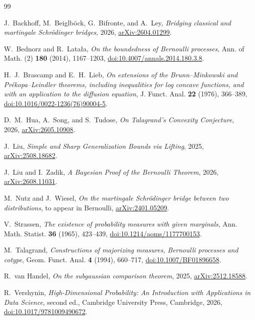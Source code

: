 \documentclass[11pt,reqno]{amsart}
\begin{document}
\begin{thebibliography}{99}

J.~Backhoff, M.~Beiglb\"ock, G.~Bifronte, and A.~Ley,
\emph{Bridging classical and martingale Schr\"odinger bridges},
2026, \href{https://arxiv.org/abs/2604.01299}{arXiv:2604.01299}.

W.~Bednorz and R.~Lata\l a,
\emph{On the boundedness of Bernoulli processes},
Ann. of Math. (2) \textbf{180} (2014), 1167--1203,
\href{https://doi.org/10.4007/annals.2014.180.3.8}
{doi:10.4007/annals.2014.180.3.8}.

H.~J.~Brascamp and E.~H.~Lieb,
\emph{On extensions of the Brunn--Minkowski and
Pr\'ekopa--Leindler theorems, including inequalities for log concave
functions, and with an application to the diffusion equation},
J. Funct. Anal. \textbf{22} (1976), 366--389,
\href{https://doi.org/10.1016/0022-1236(76)90004-5}
{doi:10.1016/0022-1236(76)90004-5}.

D.~M.~Hua, A.~Song, and S.~Tudose,
\emph{On Talagrand's Convexity Conjecture},
2026, \href{https://arxiv.org/abs/2605.10908}{arXiv:2605.10908}.

J.~Liu,
\emph{Simple and Sharp Generalization Bounds via Lifting},
2025, \href{https://arxiv.org/abs/2508.18682}{arXiv:2508.18682}.

J.~Liu and I.~Zadik,
\emph{A Bayesian Proof of the Bernoulli Theorem},
2026, \href{https://arxiv.org/abs/2608.11031}{arXiv:2608.11031}.

M.~Nutz and J.~Wiesel,
\emph{On the martingale Schr\"odinger bridge between two distributions},
to appear in Bernoulli,
\href{https://arxiv.org/abs/2401.05209}{arXiv:2401.05209}.

V.~Strassen,
\emph{The existence of probability measures with given marginals},
Ann. Math. Statist. \textbf{36} (1965), 423--439,
\href{https://doi.org/10.1214/aoms/1177700153}
{doi:10.1214/aoms/1177700153}.

M.~Talagrand,
\emph{Constructions of majorizing measures, Bernoulli processes and
cotype},
Geom. Funct. Anal. \textbf{4} (1994), 660--717,
\href{https://doi.org/10.1007/BF01896658}{doi:10.1007/BF01896658}.

R.~van Handel,
\emph{On the subgaussian comparison theorem},
2025, \href{https://arxiv.org/abs/2512.18588}{arXiv:2512.18588}.

R.~Vershynin,
\emph{High-Dimensional Probability: An Introduction with Applications
in Data Science},
second ed., Cambridge University Press, Cambridge, 2026,
\href{https://doi.org/10.1017/9781009490672}
{doi:10.1017/9781009490672}.

\end{thebibliography}
\end{document}
